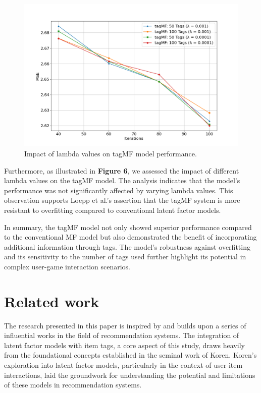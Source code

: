 \documentclass[sigplan,screen]{acmart}
\begin{document}
\begin{figure}[h]
  \centering
  \includegraphics[width=\linewidth]{evaluation_2.png}
  \caption{Impact of lambda values on tagMF model performance.}
\end{figure}

Furthermore, as illustrated in \textbf{Figure 6}, we assessed the impact of different lambda values on the tagMF model. The analysis indicates that the model's performance was not significantly affected by varying lambda values. This observation supports Loepp et al.'s \cite{LOEPP201921} assertion that the tagMF system is more resistant to overfitting compared to conventional latent factor models.

In summary, the tagMF model not only showed superior performance compared to the conventional MF model but also demonstrated the benefit of incorporating additional information through tags. The model's robustness against overfitting and its sensitivity to the number of tags used further highlight its potential in complex user-game interaction scenarios.

\section{Related work}

The research presented in this paper is inspired by and builds upon a series of influential works in the field of recommendation systems. The integration of latent factor models with item tags, a core aspect of this study, draws heavily from the foundational concepts established in the seminal work of Koren\cite{Koren09}. Koren's exploration into latent factor models, particularly in the context of user-item interactions, laid the groundwork for understanding the potential and limitations of these models in recommendation systems.
\end{document}
